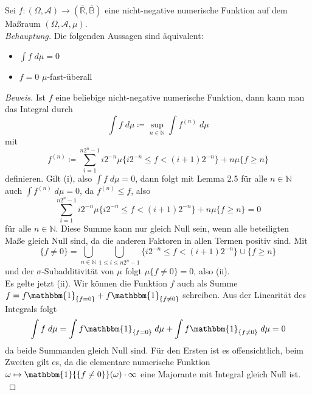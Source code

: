\documentclass[10pt]{article}
\newcommand{\beh}{\textit{Behauptung. }}
\newenvironment{Aufgabe}[2][Aufgabe]{\begin{trivlist}
\item[\hskip \labelsep {\bfseries #1}\hskip \labelsep {\bfseries #2.}]}{\end{trivlist}}
\begin{document}
\begin{Aufgabe}{3}
Sei $f:(\Omega, \mathcal{A}) \rightarrow (\bar{\mathbb{R}}, \bar{\mathbb{B}})$ eine nicht-negative numerische Funktion auf dem Maßraum $(\Omega, \mathcal{A}, \mu)$. \\

\beh 
Die folgenden Aussagen sind äquivalent:

\begin{itemize}
	\item[(i)]  $\int f \; d\mu = 0$ 
	\item[(ii)]  $f = 0$ $\mu$-fast-überall 
\end{itemize}
\end{Aufgabe}

\begin{proof}[Beweis]

Ist $f$ eine beliebige nicht-negative numerische Funktion, dann kann man das Integral durch
$$
\int f \; d\mu \coloneqq \sup_{n \in \mathbb{N}} \int f^{(n)} \; d\mu
$$
mit
$$
f^{(n)} \coloneqq  \sum_{i=1}^{n2^n-1} i2^{-n} \mu\{i2^{-n} \leq f < (i+1)2^{-n}\} + n\mu\{f \geq n\}
$$
definieren.
Gilt (i), also $\int f \; d\mu = 0$, dann folgt mit Lemma 2.5 für alle $n \in \mathbb{N}$ auch $\int f^{(n)} \; d\mu = 0$, da $f^{(n)} \leq f$, also 
$$
\sum_{i=1}^{n2^n-1} i2^{-n} \mu\{i2^{-n} \leq f < (i+1)2^{-n}\} + n\mu\{f \geq n\} =  0
$$ 
für alle $n \in \mathbb{N}$. Diese Summe kann nur gleich Null sein, wenn alle beteiligten Maße gleich Null sind, da die anderen Faktoren in allen Termen positiv sind. Mit
$$
\{f \neq 0\} = \bigcup_{n \in \mathbb{N}} \bigcup_{1 \leq i \leq n2^n-1} \{i2^{-n} \leq f < (i+1)2^{-n}\} \cup \{f \geq n\}
$$ 
und der $\sigma$-Subadditivität von $\mu$ folgt $\mu\{f \neq 0\} = 0$, also (ii). \\
Es gelte jetzt (ii). Wir können die Funktion $f$ auch als Summe $f = f\mathbbm{1}_{\{f = 0\}} + f\mathbbm{1}_{\{f \neq 0\}}$ schreiben. Aus der Linearität des Integrals folgt
$$
\int f \; d\mu = \int f\mathbbm{1}_{\{f = 0\}} \; d\mu + \int f\mathbbm{1}_{\{f \neq 0\}} \; d\mu = 0
$$
da beide Summanden gleich Null sind. Für den Ersten ist es offensichtlich, beim Zweiten gilt es, da die elementare numerische Funktion $\omega \mapsto \mathbbm{1}{\{f \neq 0\}}(\omega) \cdot \infty$ eine Majorante mit Integral gleich Null ist. \\
\end{proof} 
\end{document}
